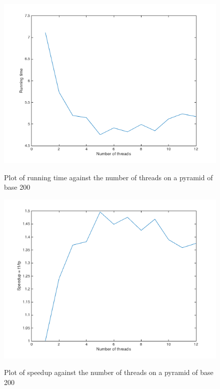 \documentclass[11pt]{article}
\begin{document}
\begin{figure}[H]
\begin{center}
\caption{Plot of running time against the number of threads on a pyramid of base 200}
\includegraphics[width=12cm]{strongplot}
\label{fig:strongscaling}
\end{center}
\end{figure}

\begin{figure}[H]
\begin{center}
\caption{Plot of speedup against the number of threads on a pyramid of base 200}
\includegraphics[width=12cm]{speedupstrong}
\label{fig:speedupstrong}
\end{center}
\end{figure}
\end{document}
